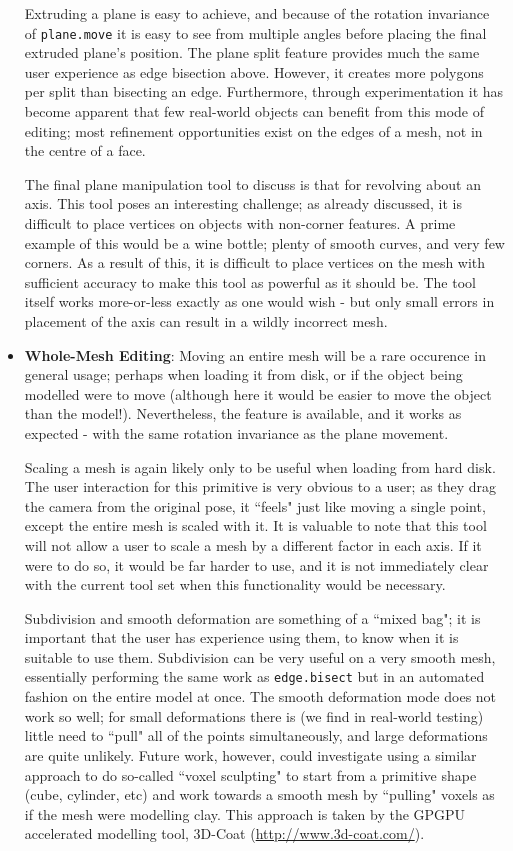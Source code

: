 \documentclass[a4paper,10pt]{article}
\begin{document}
\begin{itemize}
{Extruding a plane is easy to achieve, and because of the rotation invariance of \texttt{plane.move} it is easy to see from multiple angles before placing the final extruded plane's position. The plane split feature provides much the same user experience as edge bisection above. However, it creates more polygons per split than bisecting an edge. Furthermore, through experimentation it has become apparent that few real-world objects can benefit from this mode of editing; most refinement opportunities exist on the edges of a mesh, not in the centre of a face.

The final plane manipulation tool to discuss is that for revolving about an axis. This tool poses an interesting challenge; as already discussed, it is difficult to place vertices on objects with non-corner features. A prime example of this would be a wine bottle; plenty of smooth curves, and very few corners. As a result of this, it is difficult to place vertices on the mesh with sufficient accuracy to make this tool as powerful as it should be. The tool itself works more-or-less exactly as one would wish - but only small errors in placement of the axis can result in a wildly incorrect mesh. 

}

\item{\textbf{Whole-Mesh Editing}: Moving an entire mesh will be a rare occurence in general usage; perhaps when loading it from disk, or if the object being modelled were to move (although here it would be easier to move the object than the model!). Nevertheless, the feature is available, and it works as expected - with the same rotation invariance as the plane movement.

Scaling a mesh is again likely only to be useful when loading from hard disk. The user interaction for this primitive is very obvious to a user; as they drag the camera from the original pose, it ``feels" just like moving a single point, except the entire mesh is scaled with it. It is valuable to note that this tool will not allow a user to scale a mesh by a different factor in each axis. If it were to do so, it would be far harder to use, and it is not immediately clear with the current tool set when this functionality would be necessary.

Subdivision and smooth deformation are something of a ``mixed bag"; it is important that the user has experience using them, to know when it is suitable to use them. Subdivision can be very useful on a very smooth mesh, essentially performing the same work as \texttt{edge.bisect} but in an automated fashion on the entire model at once. The smooth deformation mode does not work so well; for small deformations there is (we find in real-world testing) little need to ``pull" all of the points simultaneously, and large deformations are quite unlikely. Future work, however, could investigate using a similar approach to do so-called ``voxel sculpting" to start from a primitive shape (cube, cylinder, etc) and work towards a smooth mesh by ``pulling" voxels as if the mesh were modelling clay. This approach is taken by the GPGPU accelerated modelling tool, 3D-Coat (\url{http://www.3d-coat.com/}).
}


\end{itemize}
\end{document}
